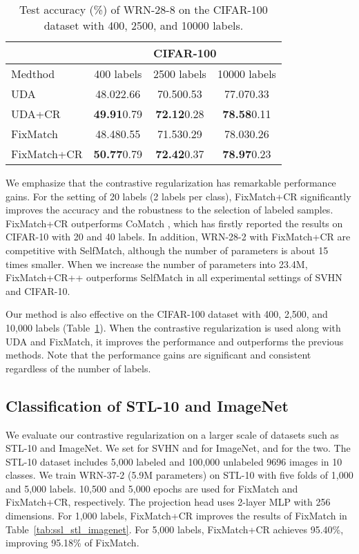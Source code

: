 \documentclass[letterpaper]{article} \usepackage{aaai22}  \usepackage{times}  \usepackage{helvet}  \usepackage{courier}  \usepackage[hyphens]{url}  \usepackage{graphicx} \urlstyle{rm} \def\UrlFont{\rm}  \usepackage{natbib}  \usepackage{caption} \DeclareCaptionStyle{ruled}{labelfont=normalfont,labelsep=colon,strut=off} \frenchspacing  \setlength{\pdfpagewidth}{8.5in}  \setlength{\pdfpageheight}{11in}  \usepackage{algorithm}
\begin{document}
\begin{table} \footnotesize
\centering
\caption{Test accuracy (\%) of WRN-28-8 on the CIFAR-100 dataset with 400, 2500, and 10000 labels.}
\begin{tabular}{l|ccc}
\hline
 & \multicolumn{3}{c}{CIFAR-100} \\ \hline
Medthod     & 400 labels & 2500 labels & 10000 labels \\ \hline
UDA & 48.02\scriptsize{2.66} & 70.50\scriptsize{0.53} & 77.07\scriptsize{0.33} \\
UDA+CR & \textbf{49.91}\scriptsize{0.79} & \textbf{72.12}\scriptsize{0.28} & \textbf{78.58}\scriptsize{0.11} \\ \hline
FixMatch & 48.48\scriptsize{0.55} & 71.53\scriptsize{0.29} & 78.03\scriptsize{0.26} \\
FixMatch+CR & \textbf{50.77}\scriptsize{0.79} & \textbf{72.42}\scriptsize{0.37} & \textbf{78.97}\scriptsize{0.23} \\ \hline
\end{tabular}
\label{tab:ssl_cifar100}
\vspace{-0.1in}
\end{table}

We emphasize that the contrastive regularization has remarkable performance gains.
For the setting of 20 labels (2 labels per class), FixMatch+CR significantly improves the accuracy and the robustness to the selection of labeled samples.
FixMatch+CR outperforms CoMatch \cite{li2020comatch}, which has firstly reported the results on CIFAR-10 with 20 and 40 labels.
In addition, WRN-28-2 with FixMatch+CR are competitive with SelfMatch, although the number of parameters is about 15 times smaller.
When we increase the number of parameters into 23.4M, FixMatch+CR++ outperforms SelfMatch in all experimental settings of SVHN and CIFAR-10.

Our method is also effective on the CIFAR-100 dataset with 400, 2,500, and 10,000 labels (Table~\ref{tab:ssl_cifar100}).
When the contrastive regularization is used along with UDA and FixMatch, it improves the performance and outperforms the previous methods.
Note that the performance gains are significant and consistent regardless of the number of labels.

\subsection{Classification of STL-10 and ImageNet}

We evaluate our contrastive regularization on a larger scale of datasets such as STL-10 and ImageNet.
We set  for SVHN and  for ImageNet, and  for the two.
The STL-10 dataset includes 5,000 labeled and 100,000 unlabeled 9696 images in 10 classes.
We train WRN-37-2 (5.9M parameters) on STL-10 with five folds of 1,000 and 5,000 labels.
10,500 and 5,000 epochs are used for FixMatch and FixMatch+CR, respectively.
The projection head uses 2-layer MLP with 256 dimensions.
For 1,000 labels, FixMatch+CR improves the results of FixMatch in Table~\ref{tab:ssl_stl_imagenet}.
For 5,000 labels, FixMatch+CR achieves 95.40\%, improving 95.18\% of FixMatch.
\end{document}
